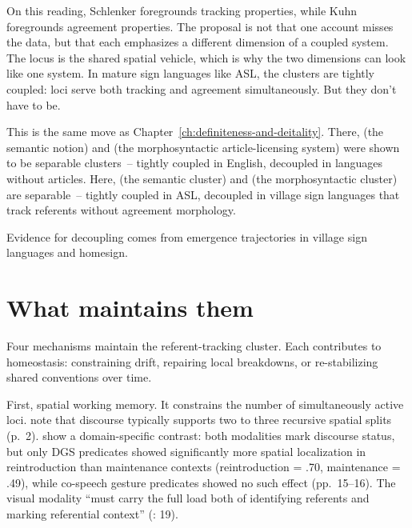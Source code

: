 \noindent On this reading, Schlenker foregrounds tracking properties, while Kuhn foregrounds agreement properties. The proposal is not that one account misses the data, but that each emphasizes a different dimension of a coupled system. The locus is the shared spatial vehicle, which is why the two dimensions can look like one system. In mature sign languages like ASL, the clusters are tightly coupled: loci serve both tracking and agreement simultaneously. But they don't have to be.

This is the same move as Chapter~\ref{ch:definiteness-and-deitality}. There,  (the semantic notion) and  (the morphosyntactic article-licensing system) were shown to be separable clusters~-- tightly coupled in English, decoupled in languages without articles. Here,  (the semantic cluster) and  (the morphosyntactic cluster) are separable~-- tightly coupled in ASL, decoupled in village sign languages that track referents without agreement morphology.

Evidence for decoupling comes from emergence trajectories in village sign languages and homesign.


\section{What maintains them}
\label{sec:sign:mechanisms}

Four mechanisms maintain the referent-tracking cluster. Each contributes to homeostasis: constraining drift, repairing local breakdowns, or re-stabilizing shared conventions over time.

First, spatial working memory. It constrains the number of simultaneously active loci. \textcite{steinbach2016} note that discourse typically supports two to three recursive spatial splits (p.~2). \textcite{perniss2015} show a domain-specific contrast: both modalities mark discourse status, but only DGS predicates showed significantly more spatial localization in reintroduction than maintenance contexts (reintroduction = .70, maintenance = .49), while co-speech gesture predicates showed no such effect (pp.~15--16). The visual modality \enquote{must carry the full load both of identifying referents and marking referential context} (\citealt{perniss2015}: 19).

